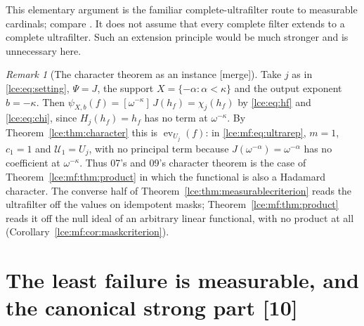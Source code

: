 \documentclass[11pt,letterpaper]{article}
\numberwithin{equation}{section}
\theoremstyle{definition}
\theoremstyle{remark}
\newtheorem{remark}[theorem]{Remark}
\newcommand{\coef}[2]{[\omega^{#1}]\,#2}
\newcommand{\thref}[1]{Theorem~\ref{#1}}
\newcommand{\src}[1]{\textup{\textsf{\small[#1]}}}%
\newcommand{\mergetag}{\textup{\textsf{\small[merge]}}}%
\newcommand{\ev}{\operatorname{ev}}
\begin{document}
This elementary argument is the familiar complete-ultrafilter route to
measurable cardinals; compare \cite{BergmanFamilies,Jech}. It does not assume
that every complete filter extends to a complete ultrafilter. Such an
extension principle would be much stronger and is unnecessary here.

\begin{remark}[The character theorem as an instance \mergetag]
\label{lce:mf:rem:character}
Take $j$ as in \eqref{lce:eq:setting}, $\Psi=J$, the support
$X=\{-\alpha:\alpha<\kappa\}$ and the output exponent $b=-\kappa$. Then
$\psi_{X,b}(f)=\coef{-\kappa}{J(h_f)}=\chi_j(h_f)$ by \eqref{lce:eq:hf} and
\eqref{lce:eq:chi}, since $H_j(h_f)=h_f$ has no term at $\omega^{-\kappa}$.
By \thref{lce:thm:character} this is $\ev_{U_j}(f)$: in
\eqref{lce:mf:eq:ultrarep}, $m=1$, $c_1=1$ and $\mathcal U_1=U_j$, with no
principal term because $J(\omega^{-\alpha})=\omega^{-\alpha}$ has no
coefficient at $\omega^{-\kappa}$. Thus 07's and 09's character theorem is
the case of \thref{lce:mf:thm:product} in which the functional is also a
Hadamard character. The converse half of
\thref{lce:thm:measurablecriterion} reads the ultrafilter off the values on
idempotent masks; \thref{lce:mf:thm:product} reads it off the null ideal of
an arbitrary linear functional, with no product at all
(Corollary~\ref{lce:mf:cor:maskcriterion}).
\end{remark}

\section{The least failure is measurable, and the canonical strong part \src{10}}
\label{lce:mf:sec:spectrum}
\end{document}
